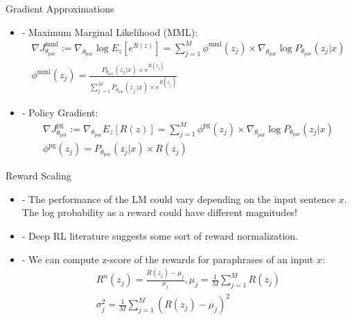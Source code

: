 \documentclass{beamer}
\begin{document}
\begin{frame}{Gradient Approximations}
\begin{itemize}
        \item - Maximum Marginal Likelihood (MML):
        \begin{multline}
\nabla J^{\text{mml}}_{\theta_{\text{par}}} := \nabla_{\theta_{\text{par}}} \log E_{z} [e^{R(z)}] =
\sum^{M}_{j=1} \phi^{\text{mml}}(z_{j}) \times \nabla_{\theta_{\text{par}}} \log P_{\theta_{\text{par}}}(z_{j}|x) \\
\phi^{\text{mml}}(z_{j}) = \frac{P_{\theta_{\text{par}}}(z_{j}|x) \times e^{R(z_{j})}}{\sum^{M}_{j^{'}=1} P_{\theta_{\text{par}}}(z_{j^{'}}|x) \times e^{R(z_{j^{'}})}}
\label{mml-objective}
\end{multline}

        \medskip

\item - Policy Gradient:
\begin{multline}
\nabla J^{\text{pg}}_{\theta_{\text{par}}} := \nabla_{\theta_{\text{par}}} E_{z} [R(z)] =
\sum^{M}_{j=1} \phi^{\text{pg}}(z_{j}) \times \nabla_{\theta_{\text{par}}} \log P_{\theta_{\text{par}}}(z_{j}|x) \\
\phi^{\text{pg}}(z_{j}) = P_{\theta_{\text{par}}}(z_{j}|x) \times R(z_{j})
\label{pg-objective}
\end{multline}

\end{itemize}

\end{frame}

\begin{frame}{Reward Scaling}
\begin{itemize}
        \item - The performance of the LM could vary depending on the input sentence $x$. The log probability as a reward could have different magnitudes!
        \medskip
        \medskip
        \medskip
        \item - Deep RL literature suggests some sort of reward normalization.
        \medskip
        \medskip
        \medskip
        \item - We can compute z-score of the rewards for paraphrases of an input $x$:
        \begin{multline}
R^{n}(z_{j}) = \frac{R(z_{j}) - \mu_{j}}{\sigma_{j}}, \mu_{j} = \frac{1}{M} \sum^{M}_{j=1} R(z_{j}) \\
\sigma^{2}_{j} = \frac{1}{M} \sum^{M}_{j=1} (R(z_{j}) - \mu_{j})^2
\label{normal-reward}
\end{multline}
\end{itemize}
\end{frame}
\end{document}
